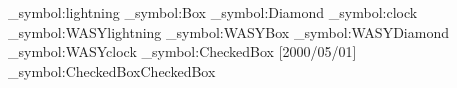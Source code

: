 {{{{  
}
\ifengine{\UTFDeclarations}{\UTFDeclarations}{}
\ifxetex\else\ifluatex\else
  \RequirePackage{textcomp}
  \RequirePackage{mathcomp}
  \fi
\fi
\ifxetex
    \else
     \ifluatex
     \else
     \fi
\fi
\newcommand{\tabitem}[2]{%
  \texttt{\symbol{`\\}#1} & \@nameuse{#1}
   & \bfseries\@nameuse{#1}& \itshape\@nameuse{#1}
   \ifthenelse{\equal{#2}{}}
    {}
    {& \texttt{\symbol{`\\}#2} & \@nameuse{#2}
     & \bfseries\@nameuse{#2}
     & \itshape\@nameuse{#2} \\}
}
\ExplSyntaxOn
\newif\ifWASY
\newcommand\WASY{\pkgname{wasysym}}
  {\WASYtrue
   \save_symbol:{lightning}
   \save_symbol:{Box}
   \save_symbol:{Diamond}
   \save_symbol:{clock}
   \RequirePackage{wasysym}
   \restore_symbol:{WASY}{lightning}
   \restore_symbol:{WASY}{Box}
   \restore_symbol:{WASY}{Diamond}
   \restore_symbol:{WASY}{clock}
  }
  {}
\ExplSyntaxOff
\newif\ifPI
\newcommand\PI{\pkgname{pifont}}
  {\PItrue\RequirePackage{pifont}}
  {}
\ExplSyntaxOn
\newif\ifMARV
\newcommand\MARV{\pkgname{marvosym}}
  {\save_symbol:{CheckedBox}
   \RequirePackage{marvosym}[2000/05/01]%
   \global\MARVtrue
   \restore_symbol:{CheckedBox}{CheckedBox}
     {\global\MARVfalse}
     {}
     {\global\MARVfalse}
     {}
  }
  {}
\ExplSyntaxOff

}}}
